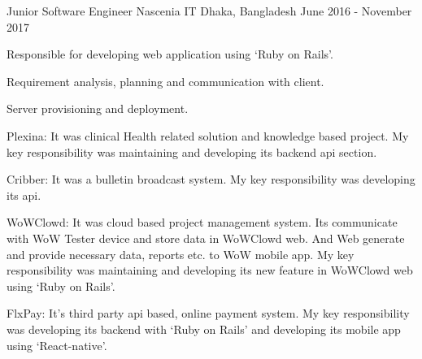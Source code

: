 \begin{cventries}
\cventry
    {Junior Software Engineer}
    {Nascenia IT}
    {Dhaka, Bangladesh}
    {June 2016 - November 2017}
    {
      \begin{cvitems}[Responsibilities:]
        \item {Responsible for developing web application using ‘Ruby on Rails’.}
        \item {Requirement analysis, planning and communication with client.}
        \item {Server provisioning and deployment.}
      \end{cvitems}
    }
    {
      \begin{cvitems}[Projects:]
        \item {Plexina:  It was clinical Health related solution and knowledge based project. My key responsibility was maintaining and developing its backend api section.}
        \item {Cribber: It was a bulletin broadcast system. My key responsibility was developing its api.}
        \item {WoWClowd: It was cloud based project management system. Its communicate with WoW Tester device and store data in WoWClowd web. And Web generate and provide necessary data, reports etc. to WoW mobile app. My key responsibility was maintaining and developing its new feature in WoWClowd web using  ‘Ruby on Rails’.
}
        \item {FlxPay:  It’s third party api based, online payment system. My key responsibility was developing its backend with ‘Ruby on Rails’ and developing its mobile app using ‘React-native’.}
      \end{cvitems}
    }
\end{cventries}
